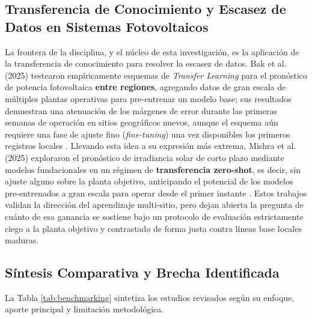 \subsection{Transferencia de Conocimiento y Escasez de Datos en Sistemas Fotovoltaicos}
La frontera de la disciplina, y el núcleo de esta investigación, es la aplicación de la transferencia de conocimiento para resolver la escasez de datos. Bak et al. (2025) testearon empíricamente esquemas de \textit{Transfer Learning} para el pronóstico de potencia fotovoltaica \textbf{entre regiones}, agregando datos de gran escala de múltiples plantas operativas para pre-entrenar un modelo base; sus resultados demuestran una atenuación de los márgenes de error durante las primeras semanas de operación en sitios geográficos nuevos, aunque el esquema aún requiere una fase de ajuste fino (\textit{fine-tuning}) una vez disponibles los primeros registros locales \cite{Bak2025}. Llevando esta idea a su expresión más extrema, Mishra et al. (2025) exploraron el pronóstico de irradiancia solar de corto plazo mediante modelos fundacionales en un régimen de \textbf{transferencia zero-shot}, es decir, sin ajuste alguno sobre la planta objetivo, anticipando el potencial de los modelos pre-entrenados a gran escala para operar desde el primer instante \cite{Mishra2025}. Estos trabajos validan la dirección del aprendizaje multi-sitio, pero dejan abierta la pregunta de cuánto de esa ganancia se sostiene bajo un protocolo de evaluación estrictamente ciego a la planta objetivo y contrastado de forma justa contra líneas base locales maduras.

\subsection{Síntesis Comparativa y Brecha Identificada}
La Tabla \ref{tab:benchmarking} sintetiza los estudios revisados según su enfoque, aporte principal y limitación metodológica.


